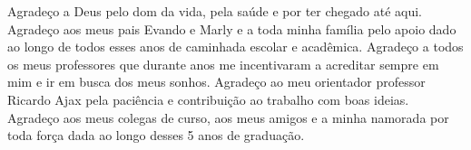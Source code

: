 \begin{agradecimentos}
Agradeço a Deus pelo dom da vida, pela saúde e por ter chegado até aqui. Agradeço aos meus pais Evando e Marly e a toda minha família pelo apoio dado ao longo de todos esses anos de caminhada escolar e acadêmica. Agradeço a todos os meus professores que durante anos me incentivaram a acreditar sempre em mim e ir em busca dos meus sonhos. Agradeço ao meu orientador professor Ricardo Ajax pela paciência e contribuição ao trabalho com boas ideias. Agradeço aos meus colegas de curso, aos meus amigos e a minha namorada por toda força dada ao longo desses 5 anos de graduação.    
\end{agradecimentos}
